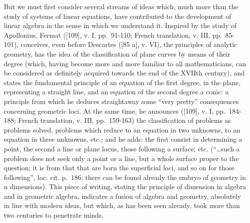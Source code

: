 But we must first consider several streams of ideas which, much more than the study of systems of linear equations, have contributed to the development of linear algebra in the sense in which we understand it. Inspired by the study of Apollonius, Fermat ({[}109{]}, v. I, pp.~91-110; French translation, v. III, pp.~85-101), conceives, even before Descartes ({[}85 a{]}, v. VI), the principles of analytic geometry, has the idea of the classification of plane curves by means of their degree (which, having become more and more familiar to all mathematicians, can be considered as definitely acquired towards the end of the XVIIth century), and states the fundamental principle of an equation of the first degree, in the plane, representing a straight line, and an equation of the second degree a conic: a principle from which he deduces straightaway some ``very pretty'' consequences concerning geometric loci. At the same time, he announces ({[}109{]}, v. I, pp.~184-188; French translation, v. III, pp.~159-163) the classification of problems as problems solved, problems which reduce to an equation in two unknowns, to an equation in three unknowns, etc.; and he adds: the first consist in determining a point, the second a line or plane locus, those following a surface; etc. (``\ldots such a problem does not seek only a point or a line, but a whole surface proper to the question; it is from that that are born the superficial loci, and so on for those following'', loc. cit. p.~186; there can be found already the embryo of geometry in n dimensions). This piece of writing, stating the principle of dimension in algebra and in geometric algebra, indicates a fusion of algebra and geometry, absolutely in line with modern ideas, but which, as has been seen already, took more than two centuries to penetrate minds.

